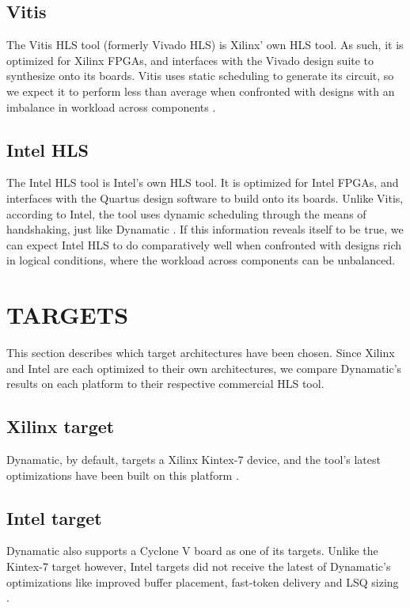\documentclass[final,5p,times,twocolumn]{elsarticle}
\begin{document}
\begin{spacing}{1.125}
\subsection{Vitis}
The Vitis HLS tool (formerly Vivado HLS) is Xilinx' own HLS tool. As such, it is optimized for Xilinx FPGAs, and interfaces with the Vivado design suite to synthesize onto its boards. Vitis uses static scheduling to generate its circuit, so we expect it to perform less than average when confronted with designs with an imbalance in workload across components \cite{vitis_hls}.

\subsection{Intel HLS}
The Intel HLS tool is Intel's own HLS tool. It is optimized for Intel FPGAs, and interfaces with the Quartus design software to build onto its boards. Unlike Vitis, according to Intel, the tool uses dynamic scheduling through the means of handshaking, just like Dynamatic \cite{intel_hls}\cite{intel_dyn_sched}. If this information reveals itself to be true, we can expect Intel HLS to do comparatively well when confronted with designs rich in logical conditions, where the workload across components can be unbalanced.

\section{TARGETS}

This section describes which target architectures have been chosen. Since Xilinx and Intel are each optimized to their own architectures, we compare Dynamatic's results on each platform to their respective commercial HLS tool.

\subsection{Xilinx target}

Dynamatic, by default, targets a Xilinx Kintex-7 device, and the tool's latest optimizations have been built on this platform \cite{dyn_tut}.

\subsection{Intel target}

Dynamatic also supports a Cyclone V board as one of its targets. Unlike the Kintex-7 target however, Intel targets did not receive the latest of Dynamatic's optimizations like improved buffer placement, fast-token delivery and LSQ sizing \cite{dyn_repository}.


\end{spacing}
\end{document}
